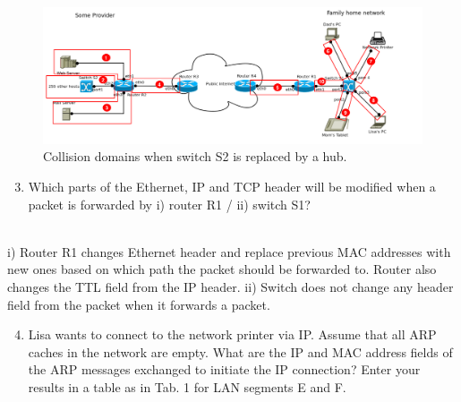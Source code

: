 \begin{figure}[H]
    \begin{center}
        \includegraphics[scale=0.5]{fig4.pdf}
        \caption{Collision domains when switch S2 is replaced by a hub.}
        \label{fig:fig4}
    \end{center}
\end{figure}





\begin{enumerate}
    \setcounter{enumi}{2}
    \item
        Which parts of the Ethernet, IP and TCP header will be modified when a packet is forwarded
        by i) router R1 / ii) switch S1?
\end{enumerate}

\begin{tcolorbox}
    \mysolution{} \\
    i) Router R1 changes Ethernet header and replace previous MAC addresses with new ones based
    on which path the packet should be forwarded to. Router also changes the TTL field from the 
    IP header.
    ii) Switch does not change any header field from the packet when it forwards a packet. 
\end{tcolorbox}


\begin{enumerate}
    \setcounter{enumi}{3}
    \item
        Lisa wants to connect to the network printer via IP. Assume that all ARP caches 
        in the network are empty. What are the IP and MAC address fields of the ARP 
        messages exchanged to initiate the IP connection? Enter your results in a table 
        as in Tab. 1 for LAN segments E and F.
\end{enumerate}

